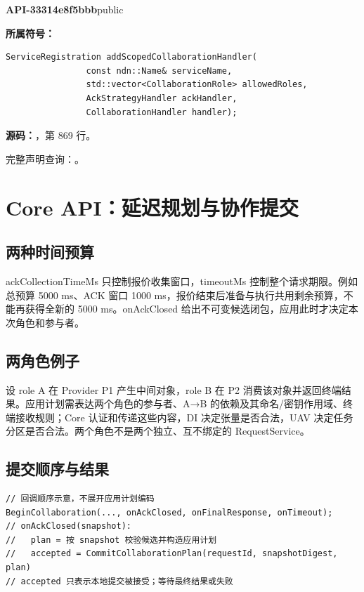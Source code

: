 \textbf{API-33314e8f5bbb}\quad public\par
\textbf{所属符号：}\par
\begin{Verbatim}[fontsize=\footnotesize,breaklines,breakanywhere]
ServiceRegistration addScopedCollaborationHandler(
                const ndn::Name& serviceName,
                std::vector<CollaborationRole> allowedRoles,
                AckStrategyHandler ackHandler,
                CollaborationHandler handler);
\end{Verbatim}
\textbf{源码：}，第 869 行。\par

完整声明查询：。

\section{Core API：延迟规划与协作提交}

\subsection{两种时间预算}
ackCollectionTimeMs 只控制报价收集窗口，timeoutMs 控制整个请求期限。例如总预算 5000 ms、ACK 窗口 1000 ms，报价结束后准备与执行共用剩余预算，不能再获得全新的 5000 ms。onAckClosed 给出不可变候选闭包，应用此时才决定本次角色和参与者。

\subsection{两角色例子}
设 role A 在 Provider P1 产生中间对象，role B 在 P2 消费该对象并返回终端结果。应用计划需表达两个角色的参与者、A→B 的依赖及其命名/密钥作用域、终端接收规则；Core 认证和传递这些内容，DI 决定张量是否合法，UAV 决定任务分区是否合法。两个角色不是两个独立、互不绑定的 RequestService。

\subsection{提交顺序与结果}

\begin{Verbatim}[fontsize=\footnotesize,breaklines,breakanywhere]
// 回调顺序示意，不展开应用计划编码
BeginCollaboration(..., onAckClosed, onFinalResponse, onTimeout);
// onAckClosed(snapshot):
//   plan = 按 snapshot 校验候选并构造应用计划
//   accepted = CommitCollaborationPlan(requestId, snapshotDigest, plan)
// accepted 只表示本地提交被接受；等待最终结果或失败
\end{Verbatim}

